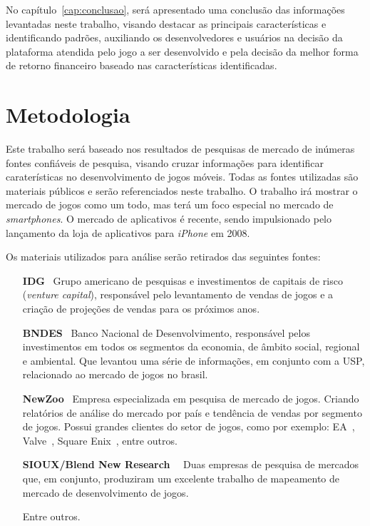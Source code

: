 No capítulo~\ref{cap:conclusao}, será apresentado uma conclusão das informações levantadas neste trabalho, visando destacar as principais características e identificando padrões, auxiliando os desenvolvedores e usuários na decisão da plataforma atendida pelo jogo a ser desenvolvido e pela decisão da melhor forma de retorno financeiro baseado nas características identificadas.



\section{Metodologia}

Este trabalho será baseado nos resultados de pesquisas de mercado de inúmeras fontes confiáveis de pesquisa, visando cruzar informações para identificar caraterísticas no desenvolvimento de jogos móveis. Todas as fontes utilizadas são materiais públicos e serão referenciados neste trabalho.\newline
O trabalho irá mostrar o mercado de jogos como um todo, mas terá um foco especial no mercado de \emph{smartphones}. O mercado de aplicativos é recente, sendo impulsionado pelo lançamento da loja de aplicativos para \emph{iPhone} em 2008.



Os materiais utilizados para análise serão retirados das seguintes fontes:


\begin{itemize}

	\item [\textbf{IDG}~\cite{idg}] Grupo americano de pesquisas e investimentos de capitais de risco (\emph{venture capital}), responsável pelo levantamento de vendas de jogos e a criação de projeções de vendas para os próximos anos.

	\item [\textbf{BNDES}~\cite{bndes}] Banco Nacional de Desenvolvimento, responsável pelos investimentos em todos os segmentos da economia, de âmbito social, regional e ambiental. Que levantou uma série de informações, em conjunto com a USP, relacionado ao mercado de jogos no brasil.
	
	\item [\textbf{NewZoo}~\cite{newzoo}] Empresa especializada em pesquisa de mercado de jogos. Criando relatórios de análise do mercado por país e tendência de vendas por segmento de jogos. Possui grandes clientes do setor de jogos, como por exemplo: EA~\cite{ea}, Valve~\cite{valve}, Square Enix~\cite{square-enix}, entre outros.
	
	
	\item[\textbf{SIOUX/Blend New Research}~\cite{sioux}~\cite{blend}] Duas empresas de pesquisa de mercados que, em conjunto, produziram um excelente trabalho de mapeamento de mercado de desenvolvimento de jogos.
	
	\item [Entre outros.]

\end{itemize}





